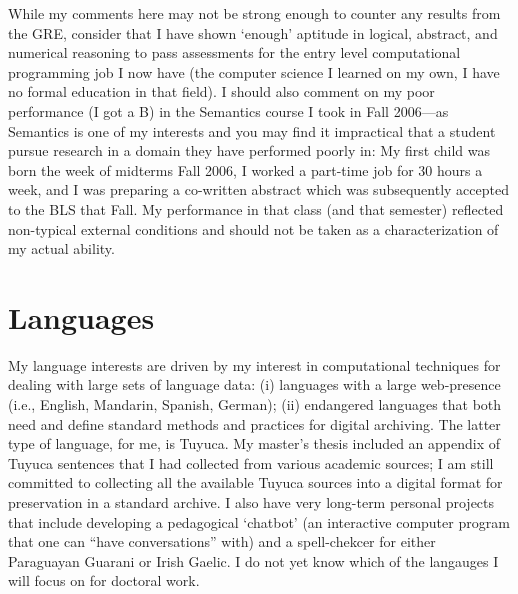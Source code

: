 \documentclass{article}
\begin{document}
While my comments here may not be strong enough to counter any results from the GRE, consider that I have shown `enough' aptitude in logical, abstract, and numerical reasoning to pass assessments for the entry level computational programming job I now have (the computer science I learned on my own, I have no formal education in that field). I should also comment on my poor performance (I got a B) in the Semantics course I took in Fall 2006---as Semantics is one of my interests and you may find it impractical that a student pursue research in a domain they have performed poorly in: My first child was born the week of midterms Fall 2006, I worked a part-time job for 30 hours a week, and I was preparing a co-written abstract which was subsequently accepted to the BLS that Fall. My performance in that class (and that semester) reflected non-typical external conditions and should not be taken as a characterization of my actual ability.


\section{Languages}
My language interests are driven by my interest in computational techniques for dealing with large sets of language data: (i) languages with a large web-presence (i.e., English, Mandarin, Spanish, German); (ii) endangered languages that both need and define standard methods and practices for digital archiving. The latter type of language, for me, is Tuyuca. My master's thesis included an appendix of Tuyuca sentences that I had collected from various academic sources; I am still committed to collecting all the available Tuyuca sources into a digital format for preservation in a standard archive. I also have very long-term personal projects that include developing a pedagogical `chatbot' (an interactive computer program that one can ``have conversations'' with) and a spell-chekcer for either Paraguayan Guarani or Irish Gaelic. 
I do not yet know which of the langauges I will focus on for doctoral work.  
\end{document}
